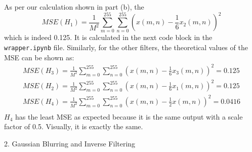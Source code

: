 \documentclass[12pt,a4paper,onecolumn]{exam}
\newcommand{\questionheader}[1]{%
  \begin{tcolorbox}[
    enhanced,
    colback=black,
    coltext=white,
    boxrule=0pt,              
    fontupper=\Large\bfseries, 
    arc=4mm                   
  ]
  #1 
  \end{tcolorbox}%
}
\begin{document}
\begin{solution}
\begin{itemize}
As per our calculation shown in part (b), the $$MSE(H_1) = \frac{1}{M^2}\sum_{m=0}^{255}\sum_{n=0}^{255}(x(m,n)-\frac{1}{6}x_2(m,n))^2 $$ which is indeed 0.125. It is calculated in the next code block in the \verb|wrapper.ipynb| file. Similarly, for the other filters, the theoretical values of the MSE can be shown as:
\[
\begin{aligned}
  MSE(H_3) = \frac{1}{M^2}\sum_{m=0}^{255}\sum_{n=0}^{255}(x(m,n)-\frac{1}{6}x_3(m,n))^2 = 0.125 \\
  MSE(H_2) = \frac{1}{M^2}\sum_{m=0}^{255}\sum_{n=0}^{255}(x(m,n)-\frac{1}{6}x_1(m,n))^2 = 0.125 \\
  MSE(H_4) = \frac{1}{M^2}\sum_{m=0}^{255}\sum_{n=0}^{255}(x(m,n)-\frac{1}{2}x(m,n))^2 = 0.0416 \\
\end{aligned}
\]
$H_4$ has the least MSE as expected because it is the same output with a scale factor of 0.5. Visually, it is exactly the same. 


\end{itemize}
\end{solution}


\questionheader{2. Gaussian Blurring and Inverse Filtering}
\end{document}
